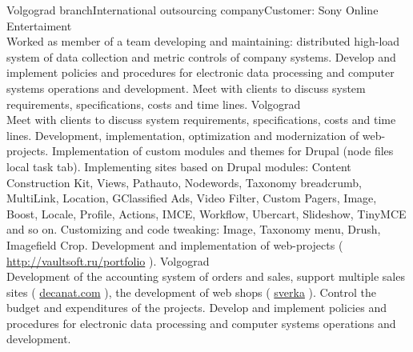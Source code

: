\documentclass[10pt,a4paper]{moderncv}
\begin{document}
    {Volgograd branch}{International outsourcing company}{Customer: Sony Online Entertaiment\\
      Worked as member of a team developing and maintaining: distributed high-load system of data collection and metric controls of company systems.
      Develop and implement policies and procedures for electronic data processing and computer systems operations and development. 
      Meet with clients to discuss system requirements, specifications, costs and time lines.
    \newline{}
    }
    {Volgograd}{}{\\Meet with clients to discuss system requirements, specifications, costs and time lines. Development, implementation, optimization and modernization of web-projects. Implementation of custom modules and themes for Drupal (node files local task tab). Implementing sites based on Drupal modules: Content Construction Kit, Views, Pathauto, Nodewords, Taxonomy breadcrumb, MultiLink, Location, GClassified Ads, Video Filter, Custom Pagers, Image, Boost, Locale, Profile, Actions, IMCE, Workflow, Ubercart, Slideshow, TinyMCE and so on. Customizing and code tweaking: Image,  Taxonomy menu, Drush, Imagefield Crop. Development and implementation of web-projects (   \url{http://vaultsoft.ru/portfolio}      ).\newline{}
    }
    {Volgograd}{}{\\Development of the accounting system of orders and sales, support multiple sales sites ( \href{http://vaultsoft.ru/portfolio/decanat.com}{decanat.com} ), the development of web shops ( \href{http://vaultsoft.ru/portfolio/sverka}{sverka} ). Control the budget and expenditures of the projects. Develop and implement policies and procedures for electronic data processing and computer systems operations and development.\newline{}
    }
\end{document}
